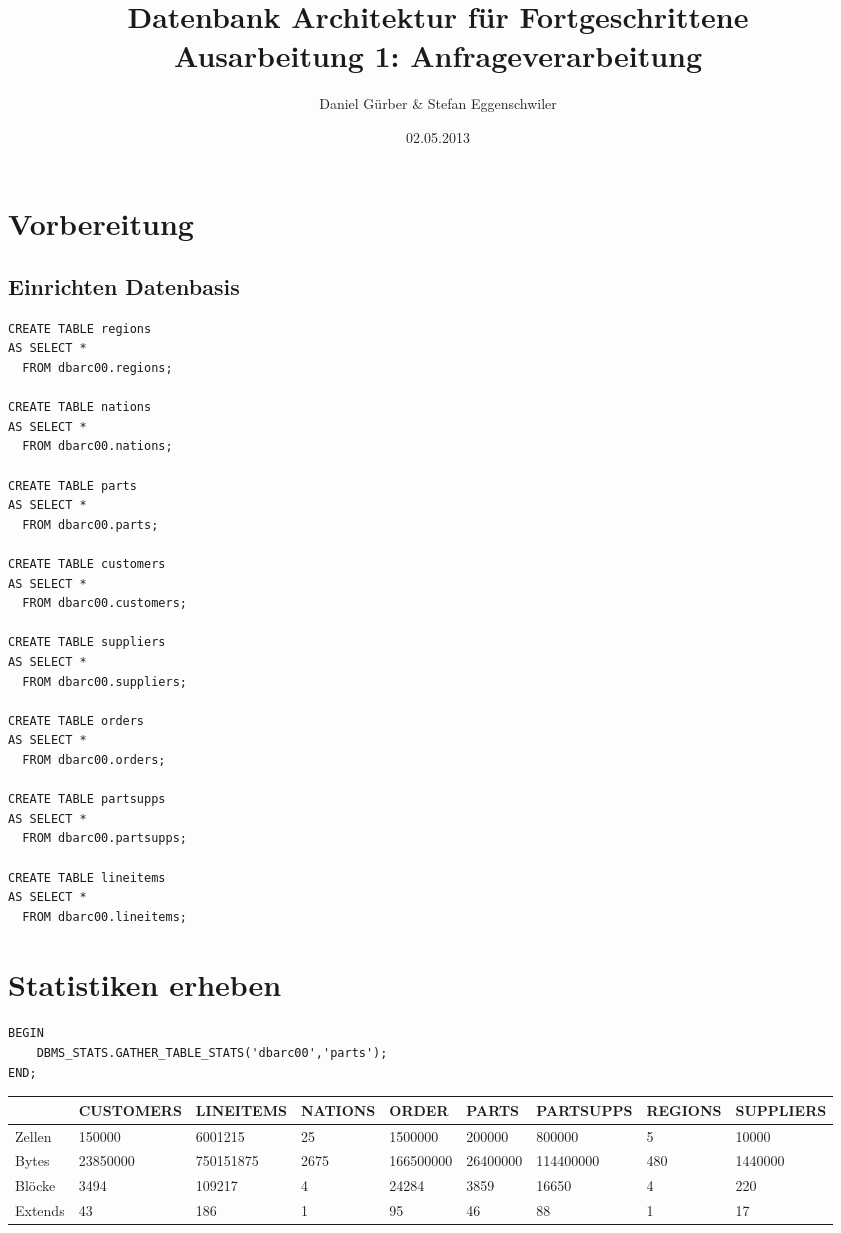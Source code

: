 \documentclass[10pt]{article}
\title{
\vspace{4cm}
\huge{Datenbank Architektur für Fortgeschrittene}\\
\vspace{0.2cm}
\Large{Ausarbeitung 1: Anfrageverarbeitung}\\
}
\author{Daniel Gürber & Stefan Eggenschwiler}
\date{02.05.2013}
\begin{document}
\maketitle
\thispagestyle{fancy}

\newpage

\tableofcontents	


\newpage
\setcounter{page}{1}


\section{Vorbereitung}
\subsection{Einrichten Datenbasis}
\begin{lstlisting}[style=sql]
CREATE TABLE regions
AS SELECT *
  FROM dbarc00.regions;
  
CREATE TABLE nations
AS SELECT *
  FROM dbarc00.nations;

CREATE TABLE parts
AS SELECT *
  FROM dbarc00.parts;
  
CREATE TABLE customers
AS SELECT *
  FROM dbarc00.customers;

CREATE TABLE suppliers
AS SELECT *
  FROM dbarc00.suppliers;

CREATE TABLE orders
AS SELECT *
  FROM dbarc00.orders;

CREATE TABLE partsupps
AS SELECT *
  FROM dbarc00.partsupps;

CREATE TABLE lineitems
AS SELECT *
  FROM dbarc00.lineitems;
\end{lstlisting}

\section{Statistiken erheben}
\begin{lstlisting}[style=sql]
BEGIN
	DBMS_STATS.GATHER_TABLE_STATS('dbarc00','parts');
END;
\end{lstlisting}
{\small
\begin{tabular}{|l|l|l|l|l|l|l|l|l|}
\hline
 & CUSTOMERS & LINEITEMS & NATIONS & ORDER & PARTS & PARTSUPPS & REGIONS & SUPPLIERS \\
\hline
\hline
Zellen & 150000 & 6001215 & 25 & 1500000 & 200000 & 800000 & 5 & 10000 \\
\hline
Bytes & 23850000 & 750151875 & 2675 & 166500000 & 26400000 & 114400000 & 480 & 1440000 \\
\hline
Blöcke & 3494 & 109217 & 4 & 24284 & 3859 & 16650 & 4 & 220 \\
\hline
Extends & 43 & 186 & 1 & 95 & 46 & 88 & 1 & 17 \\
\hline
\end{tabular}
}
\end{document}
